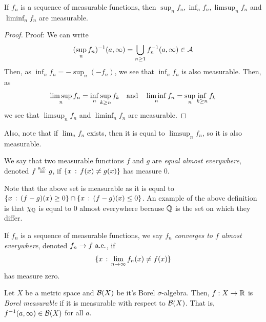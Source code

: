 \begin{lemma}
  If $f_n$ is a sequence of measurable functions, then $\sup_{n}f_n, \inf_{n}f_n, \limsup_{n}f_n$ and $\liminf_{n}f_n$ are measurable.  
\end{lemma}
\begin{proof}{Proof:}
    We can write
    \[ (\sup_{n} f_n)^{-1}(a, \infty) = \bigcup_{n \geq 1} f_{n}^{-1}(a, \infty) \in \cal{A} \]
    Then, as $\inf_{n}f_n = -\sup_{n}(-f_n)$, we see that $\inf_{n} f_n$ is also measurable. Then, as 
    \[ \limsup_{n} f_n = \inf_{n} \sup_{k \geq n} f_k \quand \liminf_{n} f_n = \sup_{n} \inf_{k \geq n} f_k \]
    we see that $\limsup_{n} f_n$ and $\liminf_{n}f_n$ are measurable. 
\end{proof}

Also, note that if $\lim_{n} f_n$ exists, then it is equal to $\limsup_{n} f_n$, so it is also measurable.\\

\begin{definition}
    We say that two measurable functions $f$ and $g$ are \emph{equal almost everywhere}, denoted $f \overset{\tt{a.e.}}{=} g$, if $\{x \col f(x) \ne g(x)\}$ has measure $0$. 
\end{definition}
Note that the above set is measurable as it is equal to $\{x \col (f - g)(x) \geq 0\} \cap \{x \col (f - g)(x) \leq 0\}$. An example of the above definition is that $\chi_{\Q}$ is equal to $0$ almost everywhere because $\Q$ is the set on which they differ.\\

\begin{definition} 
    If $f_n$ is a sequence of measurable functions, we say \emph{$f_n$ converges to $f$ almost everywhere}, denoted $f_n \to f \tt{ a.e.}$, if
    \[ \{x \col \lim_{n \to \infty} f_n(x) \ne f(x)\} \]
    has measure zero. 
\end{definition}

\begin{definition}
    Let $X$ be a metric space and $\cal{B}(X)$ be it's Borel $\sigma$-algebra. Then, $f : X \to \R$ is \emph{Borel measurable} if it is measurable with respect to $\cal{B}(X)$. That is, $f^{-1}(a, \infty) \in \cal{B}(X)$ for all $a$. 
\end{definition}